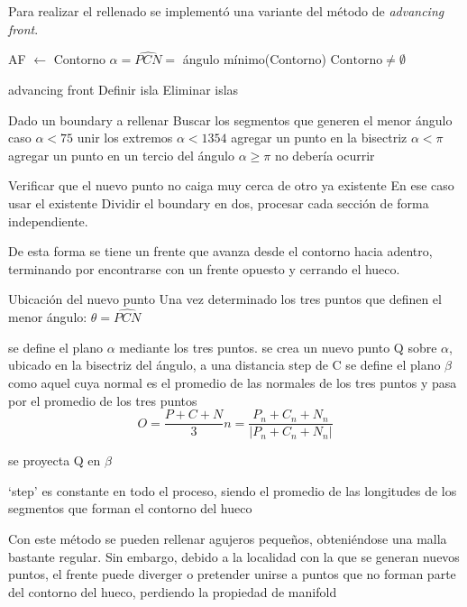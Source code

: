 		Para realizar el rellenado se implementó una variante del método de \emph{advancing front}. %
		\begin{algorithm}
			\begin{algorithmic}[1]
					\State AF $\gets$ Contorno
					\Repeat
					\State $\alpha = \widehat{PCN} =$ ángulo mínimo(Contorno)
					\Until $\mbox{Contorno} \neq \emptyset$
				\EndFunction
			\end{algorithmic}
		\end{algorithm}


	advancing front
	Definir isla
	Eliminar islas

	Dado un boundary a rellenar
		Buscar los segmentos que generen el menor ángulo
		caso $\alpha < 75$
			unir los extremos
		$\alpha < 1354$
			agregar un punto en la bisectriz
		$\alpha < \pi$
			agregar un punto en un tercio del ángulo
		$\alpha \geq \pi$
			no debería ocurrir

		Verificar que el nuevo punto no caiga muy cerca de otro ya existente
		En ese caso usar el existente
			Dividir el boundary en dos, procesar cada sección de forma independiente.

		De esta forma se tiene un frente que avanza desde el contorno hacia adentro, terminando por encontrarse con un frente opuesto y cerrando el hueco.


	Ubicación del nuevo punto
		Una vez determinado los tres puntos que definen el menor ángulo: 
			$\theta = \widehat{PCN}$

		se define el plano $\alpha$ mediante los tres puntos.
		se crea un nuevo punto Q sobre $\alpha$, ubicado en la bisectriz del ángulo, a una distancia step de C
		se define el plano $\beta$ como aquel cuya normal es el promedio de las normales de los tres puntos y pasa por el promedio de los tres puntos
		\[
		O = \frac{P+C+N}{3}
		n = \frac{P_n + C_n + N_n} {|P_n + C_n + N_n|}
		\]

		se proyecta Q en $\beta$

		`step' es constante en todo el proceso, siendo el promedio de las longitudes de los segmentos que forman el contorno del hueco


		Con este método se pueden rellenar agujeros pequeños, obteniéndose una malla bastante regular.
		Sin embargo, debido a la localidad con la que se generan nuevos puntos, el frente puede diverger o pretender unirse a puntos que no forman parte del contorno del hueco, perdiendo la propiedad de manifold

